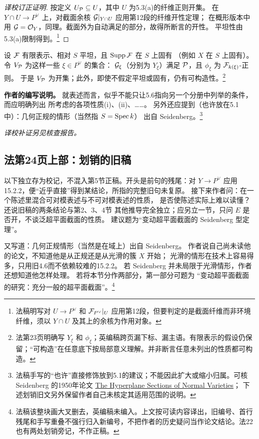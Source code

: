 \begin{proof}[译校订正证明]
按定义 $U_{\mathcal P}\subseteq U$，其中 $U$ 为5.3(a)的纤维正则开集。
在 $Y\cap U\to P^\vee$ 上，对截面余核 $\mathcal G|_{Y\cap U}$ 应用第12段的纤维开性定理；
在概形版本中用 $\mathcal G=\mathcal O_Y$，同理。截面外为自动满足的部分，故得所断言的开性。
平坦性由5.3(a)限制得到。\footnote{法稿明写对 $U\to P^\vee$ 和 $\mathcal F_{P^\vee}|_U$ 应用第12段，但要判定的是截面纤维而非环境纤维，须以 $Y\cap U$ 及其上的余核为作用对象。}
\end{proof}

设 $\mathcal F$ 有限表示、相对 $S$ 平坦，且 $\operatorname{Supp}\mathcal F$ 在 $S$ 上固有
（例如 $X$ 在 $S$ 上固有）。令 $V_{\mathcal P}$ 为这样一些 $\xi\in P^\vee$ 的集合：
$\mathcal G_\xi$（分别为 $Y_\xi$）满足 $\mathcal P$，且 $\phi_\xi$ 为 $\mathcal F_{k(\xi)}$-正则。
于是 $V_{\mathcal P}$ 为开集；此外，即使不假定平坦或固有，仍有可构造性。\footnote{法第23页明确写 $Y_\xi$ 和 $\phi_\xi$；英编稿跨页漏下标、漏主语。有限表示的假设仍保留；“可构造”在任意底下按局部意义理解。并非断言任意未列出的性质都可构造。}

\noindent\textbf{作者的编写说明。}
就表述而言，似乎不能只让5.6指向另一个分册中列举的条件，而应明确列出
所考虑的各项性质(i)、(ii)、……。
另外还应提到（也许放在5.1中）：几何正规的情形（当然指 $S=\operatorname{Spec} k$）
出自 Seidenberg。\footnote{法稿手写的“也许”直接修饰放到5.1的建议；不能因此扩大或缩小归属。可核 Seidenberg 的1950年论文
\href{https://doi.org/10.1090/S0002-9947-1950-0037548-0}{The Hyperplane Sections of Normal Varieties}；
下述划销旧文另外保留作者自己未核定其适用范围的说明。}

\par\noindent\textit{译校补证另见核查报告。}
\subsection*{法第24页上部：划销的旧稿}
以下独立存为校记，不混入第5节正稿。开头是前句的残尾：对
$Y\to P^\vee$ 应用15.2.2，便“近乎直接”得到某结论，所指的完整旧句未复原。
接下来作者问：在一个陈述里混合可对模表述与不可对模表述的性质，
是否使陈述实际上难以读懂？还说旧稿的两条结论与第2、3、4节
其他推导完全独立；应另立一节，只问 $E$ 是否开，不谈泛超平面截面的性质。
建议题为“变动超平面截面的 Seidenberg 型定理”。

又写道：几何正规情形（当然是在域上）出自 Seidenberg。
作者说自己尚未读他的论文，不知道他是从正规还是从光滑的簇 $X$ 开始；
光滑的情形在技术上容易得多，只用旧4.6而不依赖较难的15.2.2。
若 Seidenberg 并未局限于光滑情形，作者还想知道他怎样处理。
若将本节分作两部分，第一部分可题为
“变动超平面截面的研究：充分一般的超平面截面”。\footnote{法稿该整块画大叉删去，英编稿未编入。上文按可读内容译出，旧编号、首行残尾和手写重叠不强行归入新编号，不把作者的历史疑问当作论文结论。法22也有两处划销旁记，不作正稿。}

\endgroup
